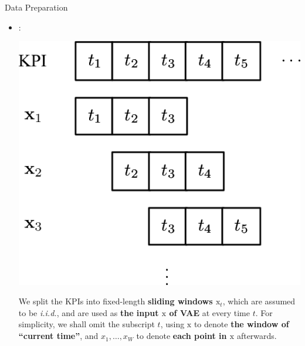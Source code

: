 \documentclass[usenames,dvipsnames]{beamer}
\newcommand{\emphasis}[1]{\textbf{\textcolor{emphcolor}{#1}}}
\newcommand{\vv}[1]{\bm{\mathrm{{#1}}}}
\begin{document}
\begin{frame}{Data Preparation}
\begin{itemize}
    \item {}:\\\vspace{.3em}
      \begin{minipage}{0.3\textwidth}
        \includegraphics[height=.33\textheight]{sliding-windows}  
      \end{minipage}\hfill
      \begin{minipage}{0.6\textwidth}
        \small
        We split the KPIs into fixed-length \emphasis{sliding windows $\vv{x}_t$}, which are assumed to be \textit{i.i.d.}, and are used as \emphasis{the input $\vv{x}$ of VAE} at every time $t$.
        For simplicity, we shall omit the subscript $t$, using \emphasis{$\vv{x}$} to denote \emphasis{the window of ``current time''}, and \emphasis{$x_1, \dots, x_W$} to denote \emphasis{each point in $\vv{x}$} afterwards.
      \end{minipage}
  \end{itemize}  
\end{frame}
\end{document}
